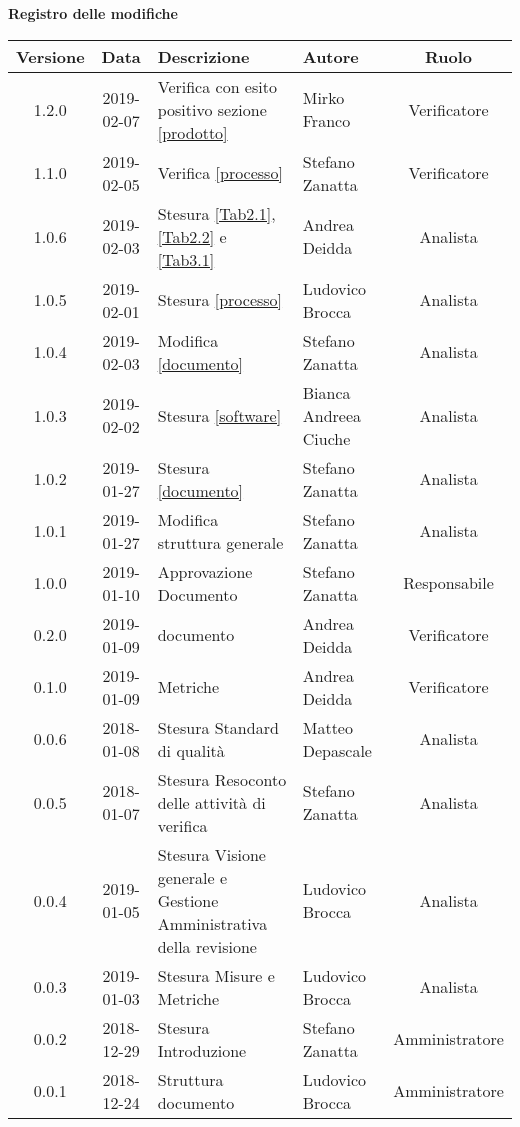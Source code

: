 	\begin{center}
		\textbf{Registro delle modifiche}
	\end{center}
	\begin{center}
		\begin{tabularx}{\textwidth}{|c|c|X|X|c|}
			\hline
			\textbf{Versione} & \textbf{Data} & \textbf{Descrizione} & \textbf{Autore} & \textbf{Ruolo} \\
			\hline
			1.2.0 & 2019-02-07 & Verifica con esito positivo sezione \ref{prodotto} & Mirko Franco & Verificatore \\
			\hline
			1.1.0 & 2019-02-05 & Verifica \ref{processo}& Stefano Zanatta & Verificatore\\
			\hline
			1.0.6 & 2019-02-03 & Stesura \ref{Tab2.1}, \ref{Tab2.2} e \ref{Tab3.1} & Andrea Deidda & Analista\\
			\hline
			1.0.5 & 2019-02-01 &Stesura \ref{processo}& Ludovico Brocca & Analista\\
			\hline
			1.0.4 & 2019-02-03 & Modifica \ref{documento}& Stefano Zanatta & Analista\\
			\hline
			1.0.3 & 2019-02-02 & Stesura \ref{software}& Bianca Andreea Ciuche & Analista\\
			\hline
			1.0.2 & 2019-01-27 & Stesura \ref{documento}& Stefano Zanatta & Analista\\
			\hline
			1.0.1 & 2019-01-27 & Modifica struttura generale& Stefano Zanatta & Analista\\
			\hline
			1.0.0 & 2019-01-10 & Approvazione Documento& Stefano Zanatta & Responsabile\\
			\hline
			0.2.0 & 2019-01-09 & \glossario{Verifica} documento & Andrea Deidda & Verificatore\\
			\hline
			0.1.0 & 2019-01-09 & \glossario{Verifica} Metriche & Andrea Deidda & Verificatore\\
			\hline
			0.0.6 & 2018-01-08 & Stesura Standard di qualità & Matteo Depascale & Analista\\
			\hline
			0.0.5 & 2018-01-07 & Stesura Resoconto delle attività di verifica & Stefano Zanatta & Analista\\
			\hline
			0.0.4 & 2019-01-05 & Stesura Visione generale e Gestione Amministrativa della revisione  & Ludovico Brocca& Analista\\
			\hline	
			0.0.3 & 2019-01-03& Stesura Misure e Metriche &Ludovico Brocca & Analista\\
			\hline
			0.0.2 & 2018-12-29 & Stesura Introduzione & Stefano Zanatta & Amministratore\\
			\hline
			0.0.1 & 2018-12-24 & Struttura documento & Ludovico Brocca & Amministratore\\
			\hline
		\end{tabularx}
	\end{center}
\newpage